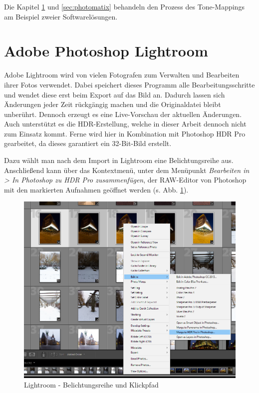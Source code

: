\documentclass[liststotoc,bibtotoc,fontsize=14pt,]{scrreprt}
\begin{document}
		\bigskip
		Die Kapitel \ref{sec:photoshop} und \ref{sec:photomatix} behandeln den Prozess des Tone-Mappings am Beispiel zweier Softwarelösungen.

	
	\section{Adobe Photoshop Lightroom}
	\label{sec:photoshop}
		Adobe Lightroom wird von vielen Fotografen zum Verwalten und Bearbeiten ihrer Fotos verwendet. Dabei speichert dieses Programm alle Bearbeitungsschritte und wendet diese erst beim Export auf das Bild an. Dadurch lassen sich Änderungen jeder Zeit rückgängig machen und die Originaldatei bleibt unberührt. Dennoch erzeugt es eine Live-Vorschau der aktuellen Änderungen. Auch unterstützt es die HDR-Erstellung, welche in dieser Arbeit dennoch nicht zum Einsatz kommt. Ferne wird hier in Kombination mit Photoshop HDR Pro gearbeitet, da dieses garantiert ein 32-Bit-Bild erstellt.
		
		\bigskip
		Dazu wählt man nach dem Import in Lightroom eine Belichtungsreihe aus. Anschließend kann über das Kontextmenü, unter dem Menüpunkt \textit{Bearbeiten in > In Photoshop zu HDR Pro zusammenfügen}, der RAW-Editor von Photoshop mit den markierten Aufnahmen geöffnet werden (s. Abb. \ref{img:light_1}).
		
		\bigskip
		\begin{figure}[H]
			\includegraphics[width=\linewidth]{img/lightroom1.png}
			\caption{Lightroom - Belichtungsreihe und Klickpfad}
			\label{img:light_1}
		\end{figure}
	
\end{document}
